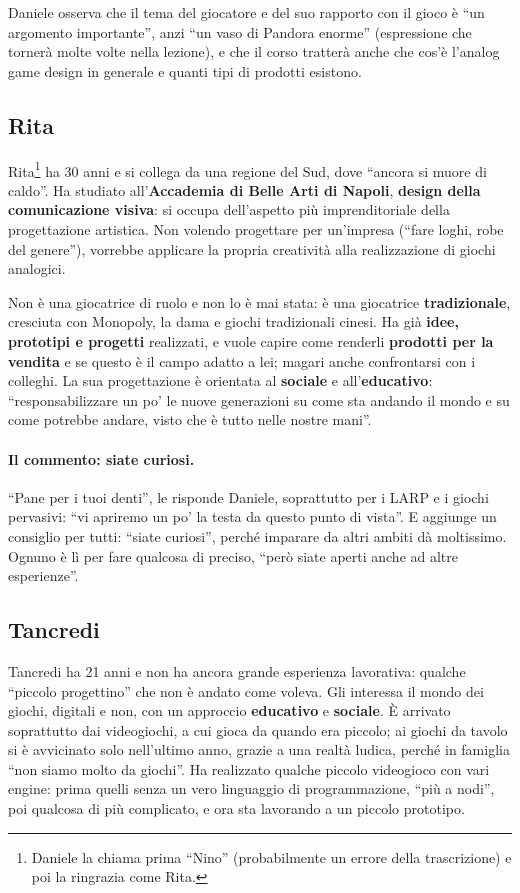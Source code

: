 Daniele osserva che il tema del giocatore e del suo rapporto con il gioco è ``un
argomento importante'', anzi ``un vaso di Pandora enorme'' (espressione che
tornerà molte volte nella lezione), e che il corso tratterà anche che cos'è
l'analog game design in generale e quanti tipi di prodotti esistono.

\subsection{Rita}

Rita\footnote{Daniele la chiama prima ``Nino'' (probabilmente un errore della
trascrizione) e poi la ringrazia come Rita.} ha 30 anni e si collega da una
regione del Sud, dove ``ancora si muore di caldo''. Ha studiato
all'\textbf{Accademia di Belle Arti di Napoli}, \textbf{design della
comunicazione visiva}: si occupa dell'aspetto più imprenditoriale della
progettazione artistica. Non volendo progettare per un'impresa (``fare loghi,
robe del genere''), vorrebbe applicare la propria creatività alla realizzazione
di giochi analogici.

Non è una giocatrice di ruolo e non lo è mai stata: è una giocatrice
\textbf{tradizionale}, cresciuta con Monopoly, la dama e giochi tradizionali
cinesi. Ha già \textbf{idee, prototipi e progetti} realizzati, e vuole capire
come renderli \textbf{prodotti per la vendita} e se questo è il campo adatto a
lei; magari anche confrontarsi con i colleghi. La sua progettazione è orientata
al \textbf{sociale} e all'\textbf{educativo}: ``responsabilizzare un po' le nuove
generazioni su come sta andando il mondo e su come potrebbe andare, visto che è
tutto nelle nostre mani''.

\paragraph{Il commento: siate curiosi.} ``Pane per i tuoi denti'', le risponde
Daniele, soprattutto per i LARP e i giochi pervasivi: ``vi apriremo un po' la
testa da questo punto di vista''. E aggiunge un consiglio per tutti: ``siate
curiosi'', perché imparare da altri ambiti dà moltissimo. Ognuno è lì per fare
qualcosa di preciso, ``però siate aperti anche ad altre esperienze''.

\subsection{Tancredi}

Tancredi ha 21 anni e non ha ancora grande esperienza lavorativa: qualche
``piccolo progettino'' che non è andato come voleva. Gli interessa il mondo dei
giochi, digitali e non, con un approccio \textbf{educativo} e \textbf{sociale}.
È arrivato soprattutto dai videogiochi, a cui gioca da quando era piccolo; ai
giochi da tavolo si è avvicinato solo nell'ultimo anno, grazie a una realtà
ludica, perché in famiglia ``non siamo molto da giochi''. Ha realizzato qualche
piccolo videogioco con vari engine: prima quelli senza un vero linguaggio di
programmazione, ``più a nodi'', poi qualcosa di più complicato, e ora sta
lavorando a un piccolo prototipo.

